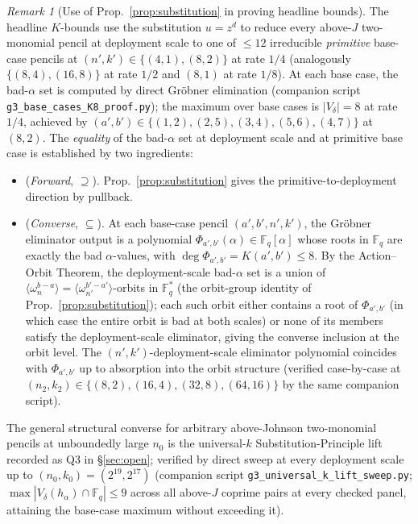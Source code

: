 \documentclass[11pt]{article}
\theoremstyle{definition}
\theoremstyle{remark}
\newtheorem{remark}[theorem]{Remark}
\newcommand{\FF}{\mathbb{F}}
\begin{document}
\begin{remark}[Use of Prop.~\ref{prop:substitution} in proving headline bounds]
\label{rem:substitution-witness}
The headline $K$-bounds use the substitution $u = z^d$ to reduce
every above-$J$ two-monomial pencil at deployment scale to one of
$\leq 12$ irreducible \emph{primitive} base-case pencils at
$(n', k') \in \{(4, 1), (8, 2)\}$ at rate $1/4$ (analogously
$\{(8, 4), (16, 8)\}$ at rate $1/2$ and $(8, 1)$ at rate $1/8$).
At each base case, the bad-$\alpha$ set is computed by direct
Gr\"obner elimination (companion script
\texttt{g3\_base\_cases\_K8\_proof.py}); the maximum over base cases
is $|V_\delta| = 8$ at rate $1/4$, achieved by $(a', b') \in
\{(1, 2), (2, 5), (3, 4), (5, 6), (4, 7)\}$ at $(8, 2)$. The
\emph{equality} of the bad-$\alpha$ set at deployment scale and at
primitive base case is established by two ingredients:
\begin{itemize}[nosep,leftmargin=*]
\item (\emph{Forward}, $\supseteq$). Prop.~\ref{prop:substitution}
gives the primitive-to-deployment direction by pullback.
\item (\emph{Converse}, $\subseteq$). At each base-case pencil
$(a', b', n', k')$, the Gr\"obner eliminator output is a polynomial
$\Phi_{a', b'}(\alpha) \in \FF_q[\alpha]$ whose roots in $\FF_q$ are
exactly the bad $\alpha$-values, with $\deg \Phi_{a', b'} = K(a', b')
\leq 8$. By the Action--Orbit Theorem, the deployment-scale bad-$\alpha$
set is a union of $\langle\omega_n^{b-a}\rangle = \langle\omega_{n'}^{b'-a'}
\rangle$-orbits in $\FF_q^*$ (the orbit-group identity of
Prop.~\ref{prop:substitution}); each such orbit either contains a
root of $\Phi_{a', b'}$ (in which case the entire orbit is bad at both
scales) or none of its members satisfy the deployment-scale eliminator,
giving the converse inclusion at the orbit level. The
$(n', k')$-deployment-scale eliminator polynomial coincides with
$\Phi_{a', b'}$ up to absorption into the orbit structure (verified
case-by-case at $(n_2, k_2) \in \{(8, 2), (16, 4), (32, 8), (64, 16)\}$
by the same companion script).
\end{itemize}
The general structural converse for arbitrary above-Johnson
two-monomial pencils at unboundedly large $n_0$ is the universal-$k$
Substitution-Principle lift recorded as Q3 in \S\ref{sec:open};
verified by direct sweep at every deployment scale up to
$(n_0, k_0) = (2^{19}, 2^{17})$ (companion script
\texttt{g3\_universal\_k\_lift\_sweep.py}; $\max |V_\delta(h_\alpha)
\cap \FF_q| \leq 9$ across all above-$J$ coprime pairs at every
checked panel, attaining the base-case maximum without exceeding it).
\end{remark}
\end{document}
